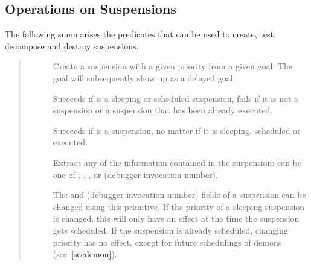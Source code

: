 {\subsection{Operations on Suspensions}
The following summarises the predicates that can be used to create, test,
decompose and destroy suspensions.
\begin{quote}
\begin{description}
\item[]
\item[]
Create a suspension with a given priority from a given goal.
The goal will subsequently show up as a delayed goal.

\item[]
Succeeds if  is a sleeping or scheduled suspension,
fails if it is not a suspension or a suspension that has been already executed.

\item[]
Succeeds if  is a suspension, no matter if it is
sleeping, scheduled or executed.

\item[]
Extract any of the information contained in the suspension:
 can be one of
, , ,  or
 (debugger invocation number).


\item[]
The  and  (debugger invocation number) fields
of a suspension can be changed using this primitive.
If the priority of a sleeping suspension is changed,
this will only have an effect at the time the suspension gets
scheduled. If the suspension is already scheduled, changing
priority has no effect, except for future schedulings of demons
(see~\ref{secdemon}).



\end{description}
\end{quote}}
